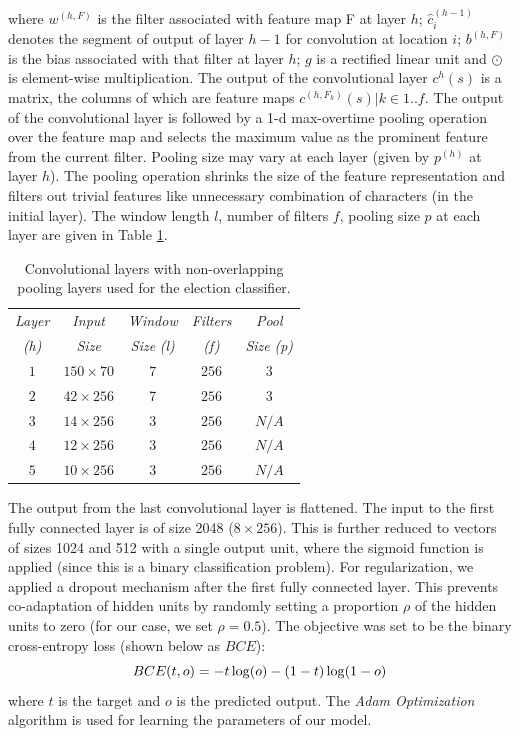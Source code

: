 \documentclass[letterpaper]{article}
\begin{document}
where
$w^{(h,F)}$ is the filter associated with feature map F at layer $h$;
$\hat{c}_i^{(h-1)}$ denotes the segment of output of layer $h-1$ for convolution at location $i$; $b^{(h,F)}$ is the bias associated with that filter at layer $h$; $g$ is a rectified linear unit and $\odot$ is element-wise multiplication. The output of the convolutional layer $c^h(s)$ is a matrix, the columns of which are feature maps $c^{(h,F_k)}(s)  \vert  k \in 1..f$. The output of the convolutional layer is followed by a 1-d max-overtime pooling operation \cite{collobert2011natural} over the feature map and selects the maximum value as the prominent feature from the current filter. Pooling size may vary at each layer (given by $p^{(h)}$ at layer $h$). The pooling operation shrinks the size of the feature representation and filters out trivial features like unnecessary combination of characters (in the initial layer). The window length $l$, number of filters $f$, pooling size $p$ at each layer are given in Table \ref{layers}.


\begin{table}[h]%
\centering
\small
\begin{tabular}{ |c|c|c|c|c| }
\hline %
 \emph{Layer} & \emph{Input}  & \emph{Window}  & \emph{Filters} & \emph{Pool}  \\
\emph{(h)}& \emph{Size} & \emph{Size} \emph{(l)} & \emph{(f)}& \emph{Size} \emph{(p)} \\\hline %
$1$ & $150\times 70$ & $7$ & $256$ & $3$ \\\hline
$2$ &$42\times 256$ &7 &$256$ & $3$ \\\hline
$3$& $14\times 256$ &  $3$ & $256$ & $N/A$\\\hline
$4$ & $12\times 256$ &$3$ & $256$ & $N/A$ \\\hline
$5$& $10\times 256$ &$3$ & $256$ & $N/A$ \\\hline
\end{tabular}
\caption{Convolutional layers with non-overlapping pooling layers used for the election classifier.}
\label{layers} %
\end{table}

The output from the last convolutional layer is flattened. The input to the first fully connected layer is of size 2048 ($8\times 256$). This is further reduced to vectors of sizes 1024 and 512 with a single output unit, where the sigmoid function is applied (since this is a binary classification problem). For regularization, we applied a dropout mechanism after the first fully connected layer. This prevents co-adaptation of hidden units by randomly setting a proportion $\rho$ of the hidden units to zero (for our case, we set $\rho=0.5$). The objective was set to be the binary cross-entropy loss (shown below as $BCE$):
\begin{equation}BCE(t,o)=-t\log(o) -\\ (1-t)\log(1-o)\end{equation}
where $t$ is the target and $o$ is the predicted output. The \emph{Adam Optimization} algorithm \cite{kingma2014adam} is used for learning the parameters of our model.
\end{document}
